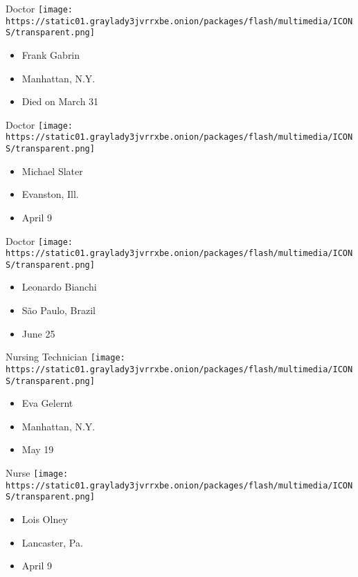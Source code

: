 \protect\hyperlink{item-frank-gabrin}{}

Doctor
\texttt{[image: https://static01.graylady3jvrrxbe.onion/packages/flash/multimedia/ICONS/transparent.png]}

\begin{itemize}
\tightlist
\item
  Frank Gabrin
\item
  Manhattan, N.Y.
\item
  Died on March 31
\end{itemize}

\protect\hyperlink{item-michael-slater}{}

Doctor
\texttt{[image: https://static01.graylady3jvrrxbe.onion/packages/flash/multimedia/ICONS/transparent.png]}

\begin{itemize}
\tightlist
\item
  Michael Slater
\item
  Evanston, Ill.
\item
  April 9
\end{itemize}

\protect\hyperlink{item-leonardo-bianchi}{}

Doctor
\texttt{[image: https://static01.graylady3jvrrxbe.onion/packages/flash/multimedia/ICONS/transparent.png]}

\begin{itemize}
\tightlist
\item
  Leonardo Bianchi
\item
  São Paulo, Brazil
\item
  June 25
\end{itemize}

\protect\hyperlink{item-eva-gelernt}{}

Nursing Technician
\texttt{[image: https://static01.graylady3jvrrxbe.onion/packages/flash/multimedia/ICONS/transparent.png]}

\begin{itemize}
\tightlist
\item
  Eva Gelernt
\item
  Manhattan, N.Y.
\item
  May 19
\end{itemize}

\protect\hyperlink{item-lois-olney}{}

Nurse
\texttt{[image: https://static01.graylady3jvrrxbe.onion/packages/flash/multimedia/ICONS/transparent.png]}

\begin{itemize}
\tightlist
\item
  Lois Olney
\item
  Lancaster, Pa.
\item
  April 9
\end{itemize}

